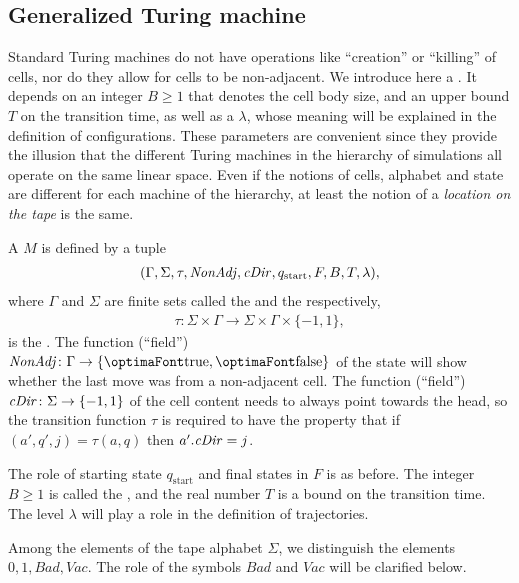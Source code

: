 \documentclass[12pt]{memoir}
\renewcommand{\ge}{\geq}
\newcommand{\fld}[1]{\ensuremath{\textit{#1\/}}}
\def\B{B}
\newcommand{\Bad}{\mathit{Bad}}
\newcommand{\Vacant}{\mathit{Vac}}
\newcommand{\Tu}{T}
\newcommand{\cDir}{\fld{cDir}}
\newcommand{\NonAdj}{\fld{NonAdj}}
\newcommand{\start}{\mathrm{start}}
\begin{document}
\subsection{Generalized Turing machine}

Standard Turing machines do not have
operations like ``creation'' or ``killing'' of cells, nor
do they allow for cells to be non-adjacent.
We introduce here a .
It depends on an integer \( \B \ge 1 \) that denotes the cell body size,
and an upper bound \( \Tu \) on the transition time, as well as a  \( \lambda \),
whose meaning will be explained in the definition of configurations.
These parameters are convenient since they provide the illusion that the different Turing
machines in the hierarchy of simulations all operate on the same linear space.
Even if the notions of cells, alphabet
and state are different for each machine of the hierarchy, 
at least the notion of a \emph{location on the tape} is the same.


\begin{definition}\label{def:gen-TM}
    A  \( M \) is defined by a tuple
        \begin{align}\label{eq:gen-TM}
             (\Gamma, \Sigma, \tau, \NonAdj, \cDir, q_{\start},F, \B, \Tu, \lambda),
       \end{align}
    where \( \Gamma \) and \( \Sigma \) are finite sets
    called the  and the  respectively,
        \begin{align*}
             \tau: \Sigma\times \Gamma
             \to \Sigma\times \Gamma\times\{-1,1\},
        \end{align*}
    is the .
The function (``field'') \( \NonAdj\colon\Gamma\to\{\true,\false\} \) of the 
state will show whether the last move was from a non-adjacent cell.
The function (``field'') \( \cDir\colon\Sigma\to\{-1,1\} \) of the cell content
needs to always point towards the head, so 
the transition function \( \tau \) is required to have the property that
if \( (a',q',j)=\tau(a,q) \) then \( a'.\cDir=j \).

The role of starting state \( q_{\start} \) and final states in \( F \) is as before.
The integer \( \B\ge 1 \) is called the ,
and the real number \( \Tu \) is a bound on the transition time.
The level \( \lambda \) will play a role in the definition of trajectories.

Among the elements of the tape alphabet \( \Sigma \), 
we distinguish the elements \( 0,1,\Bad,\Vacant \).
The role of the symbols \( \Bad \) and \( \Vacant \) will be clarified below.
\end{definition}
\end{document}
